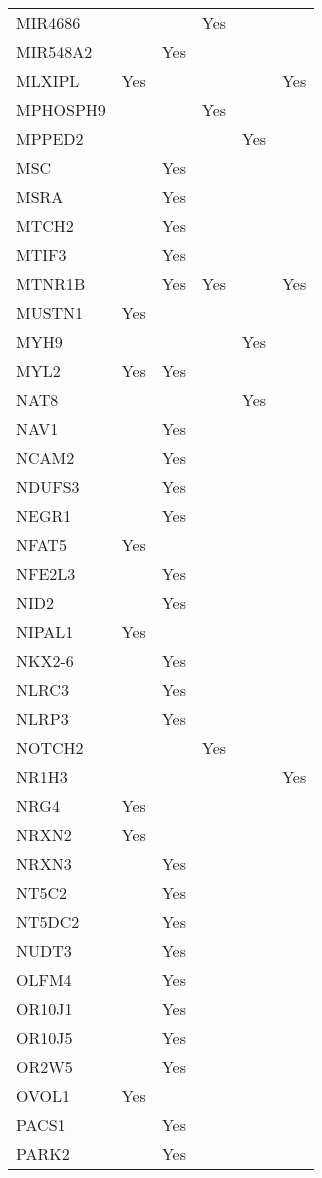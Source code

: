 \documentclass[]{report}
\begin{document}
\begin{appendices}
\begin{longtable}[t]{llllll}
MIR4686 &  &  & Yes &  & \\
MIR548A2 &  & Yes &  &  & \\
MLXIPL & Yes &  &  &  & Yes\\
MPHOSPH9 &  &  & Yes &  & \\
MPPED2 &  &  &  & Yes & \\
MSC &  & Yes &  &  & \\
MSRA &  & Yes &  &  & \\
MTCH2 &  & Yes &  &  & \\
MTIF3 &  & Yes &  &  & \\
MTNR1B &  & Yes & Yes &  & Yes\\
MUSTN1 & Yes &  &  &  & \\
MYH9 &  &  &  & Yes & \\
MYL2 & Yes & Yes &  &  & \\
NAT8 &  &  &  & Yes & \\
NAV1 &  & Yes &  &  & \\
NCAM2 &  & Yes &  &  & \\
NDUFS3 &  & Yes &  &  & \\
NEGR1 &  & Yes &  &  & \\
NFAT5 & Yes &  &  &  & \\
NFE2L3 &  & Yes &  &  & \\
NID2 &  & Yes &  &  & \\
NIPAL1 & Yes &  &  &  & \\
NKX2-6 &  & Yes &  &  & \\
NLRC3 &  & Yes &  &  & \\
NLRP3 &  & Yes &  &  & \\
NOTCH2 &  &  & Yes &  & \\
NR1H3 &  &  &  &  & Yes\\
NRG4 & Yes &  &  &  & \\
NRXN2 & Yes &  &  &  & \\
NRXN3 &  & Yes &  &  & \\
NT5C2 &  & Yes &  &  & \\
NT5DC2 &  & Yes &  &  & \\
NUDT3 &  & Yes &  &  & \\
OLFM4 &  & Yes &  &  & \\
OR10J1 &  & Yes &  &  & \\
OR10J5 &  & Yes &  &  & \\
OR2W5 &  & Yes &  &  & \\
OVOL1 & Yes &  &  &  & \\
PACS1 &  & Yes &  &  & \\
PARK2 &  & Yes &  &  & \\

\end{longtable}
\end{appendices}
\end{document}
